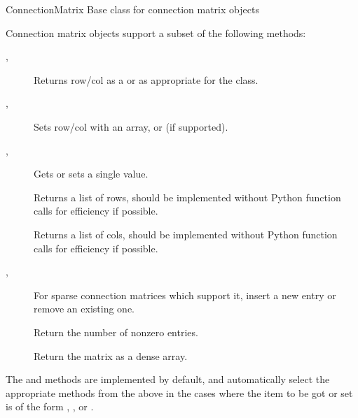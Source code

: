\documentclass[letterpaper,10pt,english]{manual}
\begin{document}
\hypertarget{brian.ConnectionMatrix}{}\begin{classdesc}{ConnectionMatrix}{}
Base class for connection matrix objects

Connection matrix objects support a subset of the following methods:
\begin{description}
\item[, ]
Returns row/col  as a \hyperlink{brian.DenseConnectionVector}{} or
\hyperlink{brian.SparseConnectionVector}{} as appropriate for the class.

\item[, ]
Sets row/col with an array, \hyperlink{brian.DenseConnectionVector}{} or
\hyperlink{brian.SparseConnectionVector}{} (if supported).

\item[, ]
Gets or sets a single value.

\item[]
Returns a list of rows, should be implemented without Python
function calls for efficiency if possible.

\item[]
Returns a list of cols, should be implemented without Python
function calls for efficiency if possible.

\item[, ]
For sparse connection matrices which support it, insert a new
entry or remove an existing one.

\item[]
Return the number of nonzero entries.

\item[]
Return the matrix as a dense array.

\end{description}

The  and  methods are implemented by
default, and automatically select the appropriate methods from the
above in the cases where the item to be got or set is of the form
\code{:}, ,  or .
\end{classdesc}
\end{document}
